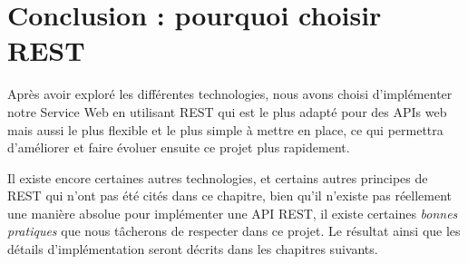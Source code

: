 %

\section{Conclusion : pourquoi choisir REST}
	Après avoir exploré les différentes technologies, nous avons choisi d'implémenter notre Service Web en utilisant REST qui est le plus adapté pour des APIs web mais aussi le plus flexible et le plus simple à mettre en place, ce qui permettra d'améliorer et faire évoluer ensuite ce projet plus rapidement.
	
	Il existe encore certaines autres technologies, et certains autres principes de REST qui n'ont pas été cités dans ce chapitre, bien qu'il n'existe pas réellement une manière absolue pour implémenter une API REST, il existe certaines \emph{bonnes pratiques} que nous tâcherons de respecter dans ce projet. Le résultat ainsi que les détails d'implémentation seront décrits dans les chapitres suivants.
